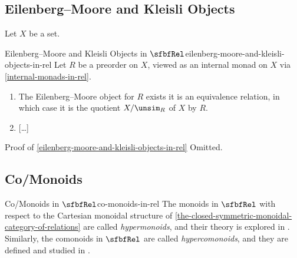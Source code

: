 \subsection{Eilenberg--Moore and Kleisli Objects}\label{subsection-eilenberg-moore-and-kleisli-objects-in-rel}
Let $X$ be a set.
\begin{proposition}{Eilenberg--Moore and Kleisli Objects in $\sfbfRel$}{eilenberg-moore-and-kleisli-objects-in-rel}%
    Let $R$ be a preorder on $X$, viewed as an internal monad on $X$ via \cref{internal-monads-in-rel}.
    \begin{enumerate}
        \item\label{eilenberg-moore-and-kleisli-objects-in-rel-eilenberg-moore-objects-in-rel}The Eilenberg--Moore object for $R$ exists \textiff it is an equivalence relation, in which case it is the quotient $X/\unsim_{R}$ of $X$ by $R$.
        \item\label{eilenberg-moore-and-kleisli-objects-in-rel-kleisli-objects-in-rel}[\ldots]
    \end{enumerate}
\end{proposition}
\begin{Proof}{Proof of \cref{eilenberg-moore-and-kleisli-objects-in-rel}}%
    Omitted.
\end{Proof}
\subsection{Co/Monoids}\label{subsection-co-monoids-in-rel}
\begin{remark}{Co/Monoids in $\sfbfRel$}{co-monoids-in-rel}%
    The monoids in $\sfbfRel$ with respect to the Cartesian monoidal structure of \cref{the-closed-symmetric-monoidal-category-of-relations} are called \emph{hypermonoids}, and their theory is explored in \ChapterHypermonoids. Similarly, the comonoids in $\sfbfRel$ are called \emph{hypercomonoids}, and they are defined and studied in \ChapterHypergroups.
\end{remark}
